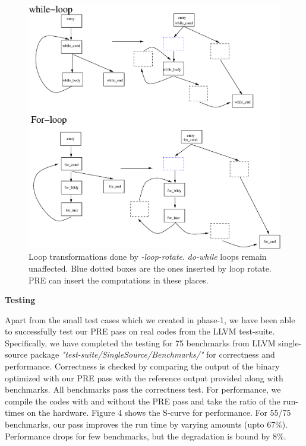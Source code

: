 \documentclass[10pt,twoside]{report}
\begin{document}
\begin{figure}[htbp]
  \begin{center}
     \includegraphics[scale=0.5]{Figs/5} 
  \end{center}
  \caption{Loop transformations done by \emph{-loop-rotate}. \emph{do-while}
    loops remain unaffected. Blue dotted boxes are the ones inserted by loop
      rotate. PRE can insert the computations in these places.}
  \label{fig:5} 
  \end{figure}


\newpage  
\begin{flushleft}
\textbf{\Large{Testing}}
\end{flushleft}

Apart from the small test cases which we created in phase-1, we have been able to 
successfully test our PRE pass on real codes from the LLVM test-suite. Specifically, we have
completed the testing for 75 benchmarks from LLVM single-source package \emph{"test-suite/SingleSource/Benchmarks/"} for correctness and performance. Correctness is checked by
comparing the output of the binary optimized with our PRE pass with the reference output 
provided along with benchmarks. All benchmarks pass the correctness test. For performance, 
we compile the codes with and without the PRE pass and take the ratio of the run-times on 
the hardware. Figure 4 shows the S-curve for performance. For 55/75 benchmarks, our pass improves 
the run time by varying amounts (upto 67\%). Performance drops for few benchmarks, but the degradation is bound by 8\%.
\end{document}
